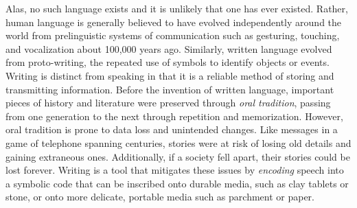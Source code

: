 Alas, no such language exists and it is unlikely that one has ever existed. Rather, human language is generally believed to have evolved independently around the world from prelinguistic systems of communication such as gesturing, touching, and vocalization about 100,000 years ago. Similarly, written language evolved from proto-writing, the repeated use of symbols to identify objects or events. \\

Writing is distinct from speaking in that it is a reliable method of storing and transmitting information. Before the invention of written language, important pieces of history and literature were preserved through \textit{oral tradition}, passing from one generation to the next through repetition and memorization. However, oral tradition is prone to data loss and unintended changes. Like messages in a game of telephone spanning centuries, stories were at risk of losing old details and gaining extraneous ones. Additionally, if a society fell apart, their stories could be lost forever. Writing is a tool that mitigates these issues by \textit{encoding} speech into a symbolic code that can be inscribed onto durable media, such as clay tablets or stone, or onto more delicate, portable media such as parchment or paper. \\


